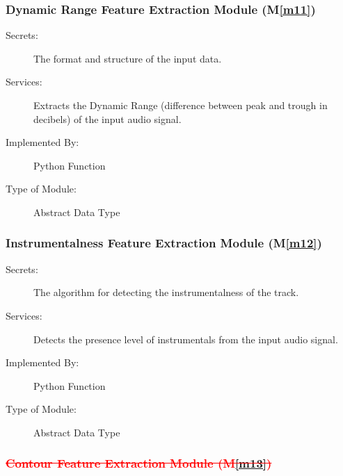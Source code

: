 \documentclass[12pt, titlepage]{article}
\newcommand{\mref}[1]{M\ref{#1}}
\begin{document}
\subsubsection{Dynamic Range Feature Extraction Module (\mref{m11})}

\begin{description}
\item[Secrets:]The format and structure of the input data.
\item[Services:]Extracts the Dynamic Range (difference between peak and trough in decibels) of the input audio signal.
\item[Implemented By:] Python Function
\item[Type of Module:] Abstract Data Type
\end{description}

\subsubsection{Instrumentalness Feature Extraction Module (\mref{m12})}

\begin{description}
\item[Secrets:] The algorithm for detecting the instrumentalness of the track. 
\item[Services:] Detects the presence level of instrumentals from the input audio signal. 
\item[Implemented By:] Python Function
\item[Type of Module:] Abstract Data Type
\end{description}


\subsubsection*{\textcolor{red}{\sout{Contour Feature Extraction Module (\mref{m13})}}}
\end{document}
